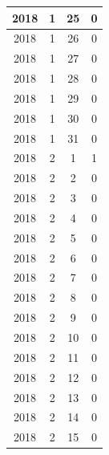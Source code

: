 \begin{longtable} {|c|c|c|c|}
\hline
2018         & 1            & 25           & 0                         \\ 
\hline
2018         & 1            & 26           & 0                         \\ 
\hline
2018         & 1            & 27           & 0                         \\ 
\hline
2018         & 1            & 28           & 0                         \\ 
\hline
2018         & 1            & 29           & 0                         \\ 
\hline
2018         & 1            & 30           & 0                         \\ 
\hline
2018         & 1            & 31           & 0                         \\ 
\hline
2018         & 2            & 1            & 1                         \\ 
\hline
2018         & 2            & 2            & 0                         \\ 
\hline
2018         & 2            & 3            & 0                         \\ 
\hline
2018         & 2            & 4            & 0                         \\ 
\hline
2018         & 2            & 5            & 0                         \\ 
\hline
2018         & 2            & 6            & 0                         \\ 
\hline
2018         & 2            & 7            & 0                         \\ 
\hline
2018         & 2            & 8            & 0                         \\ 
\hline
2018         & 2            & 9            & 0                         \\ 
\hline
2018         & 2            & 10           & 0                         \\ 
\hline
2018         & 2            & 11           & 0                         \\ 
\hline
2018         & 2            & 12           & 0                         \\ 
\hline
2018         & 2            & 13           & 0                         \\ 
\hline
2018         & 2            & 14           & 0                         \\ 
\hline
2018         & 2            & 15           & 0                         \\ 

\end{longtable}
